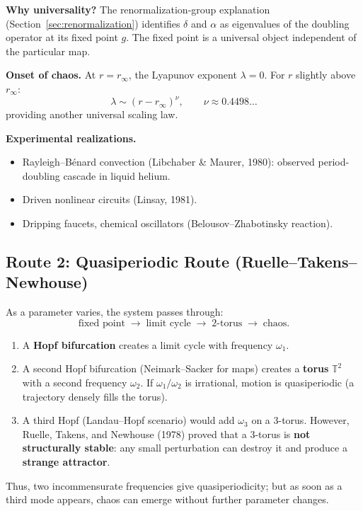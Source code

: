 \documentclass[11pt,letterpaper]{article}
\theoremstyle{definition}
\theoremstyle{plain}
\theoremstyle{remark}
\begin{document}
\textbf{Why universality?}  The renormalization-group explanation
(Section~\ref{sec:renormalization}) identifies $\delta$ and $\alpha$
as eigenvalues of the doubling operator at its fixed point $g$.  The
fixed point is a universal object independent of the particular map.

\textbf{Onset of chaos.}  At $r = r_\infty$, the Lyapunov exponent
$\lambda=0$.  For $r$ slightly above $r_\infty$:
\[
  \lambda \sim (r - r_\infty)^\nu, \qquad \nu \approx 0.4498\ldots
\]
providing another universal scaling law.

\textbf{Experimental realizations.}
\begin{itemize}[leftmargin=2em]
  \item Rayleigh--B\'enard convection (Libchaber \& Maurer, 1980):
    observed period-doubling cascade in liquid helium.
  \item Driven nonlinear circuits (Linsay, 1981).
  \item Dripping faucets, chemical oscillators (Belousov--Zhabotinsky
    reaction).
\end{itemize}

\subsection{Route 2: Quasiperiodic Route (Ruelle--Takens--Newhouse)}

As a parameter varies, the system passes through:
\[
\text{fixed point} \;\to\; \text{limit cycle} \;\to\; \text{2-torus}
\;\to\; \text{chaos}.
\]

\begin{enumerate}[leftmargin=2em]
\item A \textbf{Hopf bifurcation} creates a limit cycle with frequency
  $\omega_1$.
\item A second Hopf bifurcation (Neimark--Sacker for maps) creates a
  \textbf{torus} $\mathbb{T}^2$ with a second frequency $\omega_2$.
  If $\omega_1/\omega_2$ is irrational, motion is quasiperiodic (a
  trajectory densely fills the torus).
\item A third Hopf (Landau--Hopf scenario) would add $\omega_3$ on a
  3-torus.  However, Ruelle, Takens, and Newhouse (1978) proved that
  a 3-torus is \textbf{not structurally stable}: any small perturbation
  can destroy it and produce a \textbf{strange attractor}.
\end{enumerate}

Thus, two incommensurate frequencies give quasiperiodicity; but as soon
as a third mode appears, chaos can emerge without further parameter changes.
\end{document}
